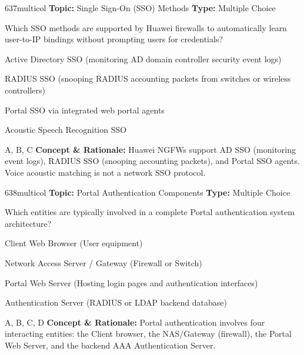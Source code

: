 \begin{qcard}{637}{multicol}
\textcolor{darkslate!75}{\small\textbf{Topic:} Single Sign-On (SSO) Methods \hfill \textbf{Type:} Multiple Choice}\vspace{0.4em}\par
Which SSO methods are supported by Huawei firewalls to automatically learn user-to-IP bindings without prompting users for credentials?
\begin{qoptions}
\item Active Directory SSO (monitoring AD domain controller security event logs)
\item RADIUS SSO (snooping RADIUS accounting packets from switches or wireless controllers)
\item Portal SSO via integrated web portal agents
\item Acoustic Speech Recognition SSO
\end{qoptions}
\end{qcard}
\nopagebreak
\begin{explainbox}{A, B, C}
\textbf{Concept \& Rationale:} Huawei NGFWs support AD SSO (monitoring event logs), RADIUS SSO (snooping accounting packets), and Portal SSO agents. Voice acoustic matching is not a network SSO protocol.
\end{explainbox}

\begin{qcard}{638}{multicol}
\textcolor{darkslate!75}{\small\textbf{Topic:} Portal Authentication Components \hfill \textbf{Type:} Multiple Choice}\vspace{0.4em}\par
Which entities are typically involved in a complete Portal authentication system architecture?
\begin{qoptions}
\item Client Web Browser (User equipment)
\item Network Access Server / Gateway (Firewall or Switch)
\item Portal Web Server (Hosting login pages and authentication interfaces)
\item Authentication Server (RADIUS or LDAP backend database)
\end{qoptions}
\end{qcard}
\nopagebreak
\begin{explainbox}{A, B, C, D}
\textbf{Concept \& Rationale:} Portal authentication involves four interacting entities: the Client browser, the NAS/Gateway (firewall), the Portal Web Server, and the backend AAA Authentication Server.
\end{explainbox}

